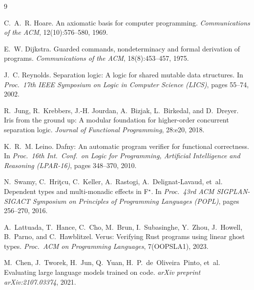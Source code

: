 \documentclass[sigconf,nonacm]{acmart}
\begin{document}
\begin{thebibliography}{9}

C.~A.~R. Hoare.
\newblock An axiomatic basis for computer programming.
\newblock \emph{Communications of the ACM}, 12(10):576--580, 1969.

E.~W. Dijkstra.
\newblock Guarded commands, nondeterminacy and formal derivation of programs.
\newblock \emph{Communications of the ACM}, 18(8):453--457, 1975.

J.~C. Reynolds.
\newblock Separation logic: A logic for shared mutable data structures.
\newblock In \emph{Proc.\ 17th IEEE Symposium on Logic in Computer Science
(LICS)}, pages 55--74, 2002.

R.~Jung, R.~Krebbers, J.-H. Jourdan, A.~Bizjak, L.~Birkedal, and D.~Dreyer.
\newblock Iris from the ground up: A modular foundation for higher-order
concurrent separation logic.
\newblock \emph{Journal of Functional Programming}, 28:e20, 2018.

K.~R.~M. Leino.
\newblock Dafny: An automatic program verifier for functional correctness.
\newblock In \emph{Proc.\ 16th Int.\ Conf.\ on Logic for Programming, Artificial
Intelligence and Reasoning (LPAR-16)}, pages 348--370, 2010.

N.~Swamy, C.~Hri\c{t}cu, C.~Keller, A.~Rastogi, A.~Delignat-Lavaud, et~al.
\newblock Dependent types and multi-monadic effects in F$^\star$.
\newblock In \emph{Proc.\ 43rd ACM SIGPLAN-SIGACT Symposium on Principles of
Programming Languages (POPL)}, pages 256--270, 2016.

A.~Lattuada, T.~Hance, C.~Cho, M.~Brun, I.~Subasinghe, Y.~Zhou, J.~Howell,
B.~Parno, and C.~Hawblitzel.
\newblock Verus: Verifying Rust programs using linear ghost types.
\newblock \emph{Proc.\ ACM on Programming Languages}, 7(OOPSLA1), 2023.

M.~Chen, J.~Tworek, H.~Jun, Q.~Yuan, H.~P.~de~Oliveira~Pinto, et~al.
\newblock Evaluating large language models trained on code.
\newblock \emph{arXiv preprint arXiv:2107.03374}, 2021.

\end{thebibliography}
\end{document}
